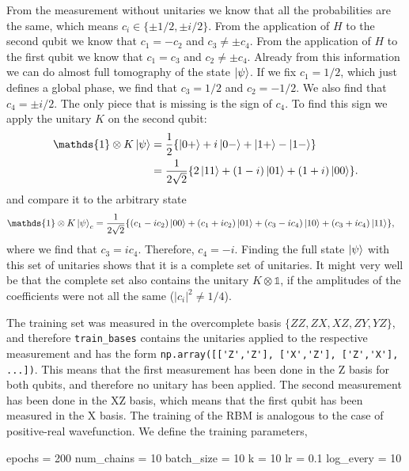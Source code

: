 \documentclass[submission, Phys]{SciPost}
\begin{document}
From the measurement without unitaries we know that all the probabilities are the same,
which means $c_i \in \{ \pm 1/2, \pm i/2 \}$.
From the application of $H$ to the second qubit we know that $c_1 = -c_2$ and $c_3 \neq \pm c_4$.
From the application of $H$ to the first qubit we know that $c_1 = c_3$ and $c_2 \neq \pm c_4$.
Already from this information we can do almost full tomography of the state $\ket{\psi}$.
If we fix $c_1 = 1/2$, which just defines a global phase, we find that $c_3 = 1/2$ and $c_2 = -1/2$.
We also find that $c_4 = \pm i/2$.
The only piece that is missing is the sign of $c_4$. To find this sign we apply the unitary $K$ on the second qubit:
\begin{align}
	\mathds{1} \otimes K \ket{\psi} & = \frac{1}{2} \{ \ket{0+} +i \ket{0-} + \ket{1+} - \ket{1-} \}           \\
	                                & = \frac{1}{2 \sqrt{2}} \{ 2 \ket{11} + (1-i)\ket{01} + (1+i)\ket{00} \}.
\end{align}
%
and compare it to the arbitrary state
%
\begin{align}
	\mathds{1} \otimes K \ket{\psi}_c & = \frac{1}{2\sqrt{2}} \{ (c_1-ic_2) \ket{00} + (c_1 +ic_2)\ket{01} + (c_3 -ic_4)\ket{10} + (c_3+ic_4)\ket{11} \},
\end{align}
%
where we find that $c_3 = ic_4$. Therefore, $c_4 = -i$.
Finding the full state $\ket{\psi}$ with this set of unitaries shows that it is a complete set of unitaries.
It might very well be that the complete set also contains the unitary $K \otimes \mathds{1}$,
if the amplitudes of the coefficients were not all the same ($|c_i|^2 \neq 1/4$).

The training set was measured in the overcomplete basis $\{ZZ, ZX, XZ, ZY, YZ \}$, and therefore \verb|train_bases| contains the unitaries applied to the respective measurement and has the form \verb|np.array([['Z','Z'], ['X','Z'], ['Z','X'], ...])|.
This means that the first measurement has been done in the Z basis for both qubits,
and therefore no unitary has been applied. The second measurement has been done in the XZ basis,
which means that the first qubit has been measured in the X basis. The training of the RBM is analogous to the case of positive-real wavefunction.
We define the training parameters,

\begin{python}
	epochs   = 200
	num_chains = 10
	batch_size = 10
	k     = 10
	lr     = 0.1
	log_every = 10
\end{python}
\end{document}
